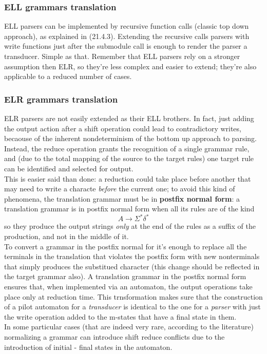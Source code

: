 			\subsubsection{ELL grammars translation}
				ELL parsers can be implemented by recursive function calls (classic top down approach), as explained in (21.4.3). Extending the recursive calls parsers with write functions just after the submodule call is enough to render the parser a transducer. Simple as that. Remember that ELL parsers rely on a stronger assumption then ELR, so they're less complex and easier to extend; they're also applicable to a reduced number of cases.
			
			\subsubsection{ELR grammars translation}
				ELR parsers are not easily extended as their ELL brothers. In fact, just adding the output action after a shift operation could lead to contradictory writes, becaouse of the inherent nondeterminism of the bottom up approach to parsing. Instead, the reduce operation grants the recognition of a single grammar rule, and (due to the total mapping of the source to the target rules) one target rule can be identified and selected for output.\\
				This is easier said than done: a reduction could take place before another that may need to write a characte \emph{before} the current one; to avoid this kind of phenomena, the translation grammar must be in \textbf{postfix normal form}: a translation grammar is in postfix normal form when all its rules are of the kind
				\begin{equation}
					A \rightarrow \Sigma^\ast \delta^\ast
				\end{equation} 
				so they produce the output strings \emph{only} at the end of the rules as a suffix of the production, and not in the middle of it.\\
				To convert a grammar in the postfix normal for it's enough to replace all the terminals in the translation that violates the postfix form with new nonterminals that simply produces the substitued character (this change should be reflected in the target grammar also). A translation grammar in the postfix normal form ensures that, when implemented via an automaton, the output operations take place only at reduction time. This trnsformation makes sure that the construction of a pilot automaton for a \emph{transducer} is identical to the one for a \emph{parser} with just the write operation added to the m-states that have a final state in them.\\
				In some particular cases (that are indeed very rare, according to the literature) normalizing a grammar can introduce shift reduce conflicts due to the introduction of initial - final states in the automaton.
			
